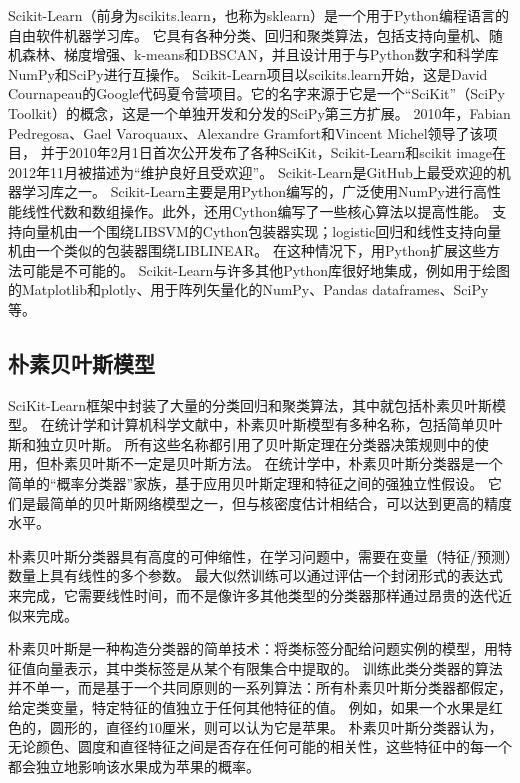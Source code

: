 Scikit-Learn（前身为scikits.learn，也称为sklearn）是一个用于Python编程语言的自由软件机器学习库\cite{pedregosa2011scikit}。
它具有各种分类、回归和聚类算法，包括支持向量机、随机森林、梯度增强、k-means和DBSCAN，并且设计用于与Python数字和科学库NumPy和SciPy进行互操作。
Scikit-Learn项目以scikits.learn开始，这是David Cournapeau的Google代码夏令营项目。它的名字来源于它是一个“SciKit”（SciPy Toolkit）的概念，这是一个单独开发和分发的SciPy\cite{kramer2016scikit}第三方扩展。
2010年，Fabian Pedregosa、Gael Varoquaux、Alexandre Gramfort和Vincent Michel领导了该项目，
并于2010年2月1日首次公开发布了各种SciKit，Scikit-Learn和scikit image在2012年11月被描述为“维护良好且受欢迎”\cite{bressert2012scipy}。
Scikit-Learn是GitHub\cite{gonzalez2020state}上最受欢迎的机器学习库之一。
Scikit-Learn主要是用Python编写的，广泛使用NumPy进行高性能线性代数和数组操作。此外，还用Cython编写了一些核心算法以提高性能。
支持向量机由一个围绕LIBSVM的Cython包装器实现；logistic回归和线性支持向量机由一个类似的包装器围绕LIBLINEAR。
在这种情况下，用Python扩展这些方法可能是不可能的。
Scikit-Learn与许多其他Python库很好地集成，例如用于绘图的Matplotlib和plotly、用于阵列矢量化的NumPy、Pandas dataframes、SciPy等。

\subsection{朴素贝叶斯模型}

SciKit-Learn框架中封装了大量的分类回归和聚类算法，其中就包括朴素贝叶斯模型。
在统计学和计算机科学文献中，朴素贝叶斯模型有多种名称，包括简单贝叶斯和独立贝叶斯。
所有这些名称都引用了贝叶斯定理在分类器决策规则中的使用，但朴素贝叶斯不一定是贝叶斯方法。
在统计学中，朴素贝叶斯分类器是一个简单的“概率分类器”家族\cite{larranaga2013review}，基于应用贝叶斯定理和特征之间的强独立性假设。
它们是最简单的贝叶斯网络模型之一，但与核密度估计相结合，可以达到更高的精度水平\cite{piryonesi2020role}。

朴素贝叶斯分类器具有高度的可伸缩性，在学习问题中，需要在变量（特征/预测）数量上具有线性的多个参数。
最大似然训练可以通过评估一个封闭形式的表达式来完成\cite{russell2002artificial}，它需要线性时间，而不是像许多其他类型的分类器那样通过昂贵的迭代近似来完成。

朴素贝叶斯是一种构造分类器的简单技术：将类标签分配给问题实例的模型，用特征值向量表示，其中类标签是从某个有限集合中提取的。
训练此类分类器的算法并不单一，而是基于一个共同原则的一系列算法：所有朴素贝叶斯分类器都假定，给定类变量，特定特征的值独立于任何其他特征的值。
例如，如果一个水果是红色的，圆形的，直径约10厘米，则可以认为它是苹果。
朴素贝叶斯分类器认为，无论颜色、圆度和直径特征之间是否存在任何可能的相关性，这些特征中的每一个都会独立地影响该水果成为苹果的概率。

